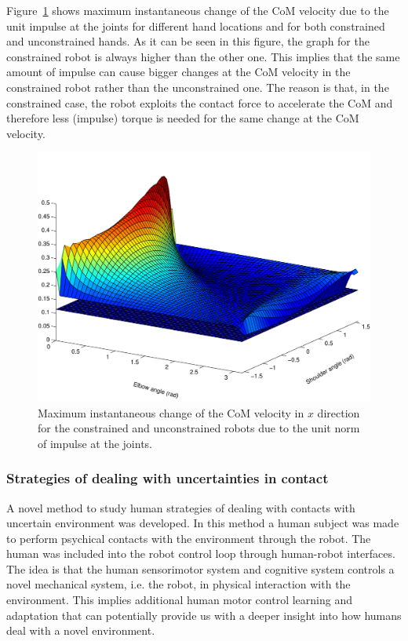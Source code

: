 \documentclass[final,5p,twocolumn]{elsarticle}
\begin{document}
Figure~\ref{type3} shows maximum instantaneous change of the CoM velocity due
to the unit impulse at the joints for different hand locations and for both
constrained and unconstrained hands. As it can be seen in this figure, the
graph for the constrained robot is always higher than the other one. This
implies that the same amount of impulse can cause bigger changes at the CoM
velocity in the constrained robot rather than the unconstrained one. The
reason is that, in the constrained case, the robot exploits the contact force
to accelerate the CoM and therefore less (impulse) torque is needed for the
same change at the CoM velocity.
\begin{figure}[!t]
  \centering
  \includegraphics[width=\linewidth]{images/type3.pdf}
  \caption{Maximum instantaneous change of the CoM velocity in $x$ direction
    for the constrained and unconstrained robots due to the unit norm of
    impulse at the joints.}
  \label{type3}
\end{figure}




\subsubsection{Strategies of dealing with uncertainties in contact}
A novel method to study human strategies of dealing with contacts with uncertain environment was developed. In this method a human subject was made to perform psychical contacts with the environment through the robot. The human was included into the robot control loop through human-robot interfaces. The idea is that the human sensorimotor system and cognitive system controls a novel mechanical system, i.e. the robot, in physical interaction with the environment. This implies additional human motor control learning and adaptation that can potentially provide us with a deeper insight into how humans deal with a novel environment.
\end{document}
